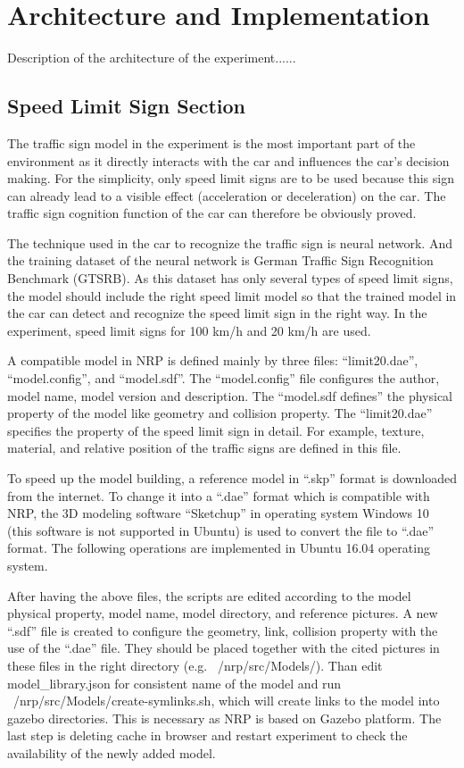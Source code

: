
\section{Architecture and Implementation}

Description of the architecture of the experiment......

\subsection{Speed Limit Sign Section}

The traffic sign model in the experiment is the most important part of the environment as it directly interacts with the car and influences the car’s decision making. For the simplicity, only speed limit signs are to be used because this sign can already lead to a visible effect (acceleration or deceleration) on the car. The traffic sign cognition function of the car can therefore be obviously proved. 

The technique used in the car to recognize the traffic sign is neural network. And the training dataset of the neural network is German Traffic Sign Recognition Benchmark (GTSRB). As this dataset has only several types of speed limit signs, the model should include the right speed limit model so that the trained model in the car can detect and recognize the speed limit sign in the right way. In the experiment, speed limit signs for 100 km/h and 20 km/h are used.

A compatible model in NRP is defined mainly by three files: “limit20.dae”, “model.config”, and “model.sdf”. The “model.config” file configures the author, model name, model version and description. The “model.sdf defines” the physical property of the model like geometry and collision property. The “limit20.dae” specifies the property of the speed limit sign in detail. For example, texture, material, and relative position of the traffic signs are defined in this file.

To speed up the model building, a reference model in “.skp” format is downloaded from the internet. To change it into a “.dae” format which is compatible with NRP, the 3D modeling software “Sketchup” in operating system Windows 10 (this software is not supported in Ubuntu) is used to convert the file to “.dae” format. The following operations are implemented in Ubuntu 16.04 operating system. 
                                                                                  
After having the above files, the scripts are edited according to the model physical property, model name, model directory, and reference pictures. A new “.sdf” file is created to configure the geometry, link, collision property with the use of the “.dae” file. They should be placed together with the cited pictures in these files in the right directory (e.g. ~/nrp/src/Models/). Than edit model_library.json for consistent name of the model and run ~/nrp/src/Models/create-symlinks.sh, which will create links to the model into gazebo directories. This is necessary as NRP is based on Gazebo platform. The last step is deleting cache in browser and restart experiment to check the availability of the newly added model.




